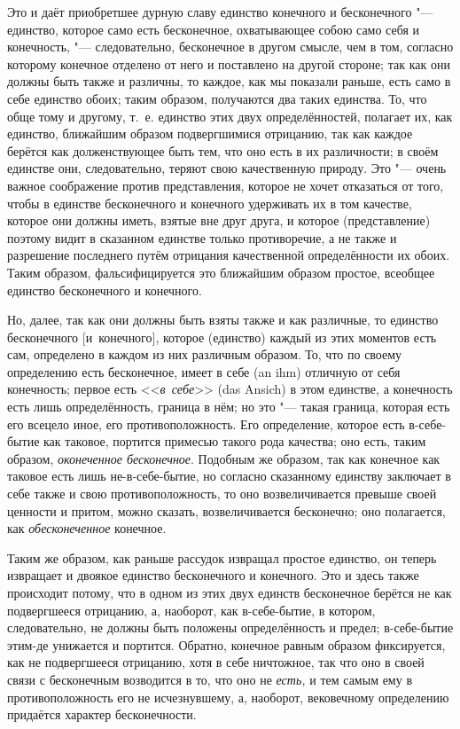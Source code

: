 Это и даёт приобретшее дурную славу единство конечного и бесконечного
"--- единство, которое само есть бесконечное, охватывающее собою само себя и
конечность, "--- следовательно, бесконечное в другом смысле, чем в том,
согласно которому конечное отделено от него и поставлено на другой стороне;
так как они должны быть также и различны, то каждое, как мы показали
раньше, есть само в себе единство обоих; таким образом, получаются два
таких единства. То, что обще тому и другому, т.~е. единство этих двух
определённостей, полагает их, как единство, ближайшим образом подвергшимися
отрицанию, так как каждое берётся как долженствующее быть тем, что оно есть
в их различности; в своём единстве они, следовательно, теряют свою
качественную природу. Это "--- очень важное соображение против представления,
которое не хочет отказаться от того, чтобы в единстве бесконечного и
конечного удерживать их в том качестве, которое они должны иметь, взятые
вне друг друга, и которое (представление) поэтому видит в сказанном
единстве только противоречие, а не также и разрешение последнего путём
отрицания качественной определённости их обоих. Таким образом,
фальсифицируется это ближайшим образом простое, всеобщее единство
бесконечного и конечного.

Но, далее, так как они должны быть взяты также и как различные, то единство
бесконечного [и~конечного], которое (единство) каждый из этих моментов есть
сам, определено в каждом из них различным образом. То, что по своему
определению есть бесконечное, имеет в себе (an ihm) отличную от себя
конечность; первое есть <<{\em в~себе}>> (das Ansich) в
этом единстве, а конечность есть лишь определённость, граница в нём; но это
"--- такая граница, которая есть его всецело иное, его
противоположность. Его определение, которое есть в-себе-бытие как таковое,
портится примесью такого рода качества; оно есть, таким образом,
{\em оконеченное бесконечное}. Подобным же образом, так
как конечное как таковое есть лишь не-в-себе-бытие, но согласно сказанному
единству заключает в себе также и свою противоположность, то оно
возвеличивается превыше своей ценности и притом, можно сказать,
возвеличивается бесконечно; оно полагается, как
{\em обесконеченное} конечное.

Таким же образом, как раньше рассудок извращал простое единство, он
теперь извращает и двоякое единство бесконечного и конечного.
Это и здесь также происходит потому, что в одном из этих двух единств
бесконечное берётся не как подвергшееся отрицанию, а, наоборот, как
в-себе-бытие, в котором, следовательно, не должны быть положены
определённость и предел; в-себе-бытие этим-де унижается и портится.
Обратно, конечное равным образом фиксируется, как не подвергшееся
отрицанию, хотя в себе ничтожное, так что оно в своей связи с бесконечным
возводится в то, что оно не {\em есть,} и тем самым ему
в противоположность его не исчезнувшему, а, наоборот, вековечному
определению придаётся характер бесконечности.

